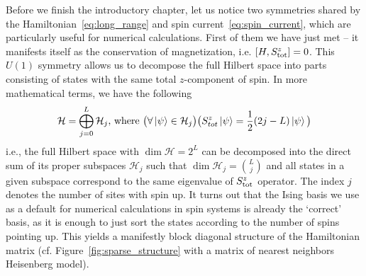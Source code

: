 Before we finish the introductory chapter, let us notice two symmetries shared by the
Hamiltonian~\eqref{eq:long_range} and spin current~\eqref{eq:spin_current}, which are particularly useful for numerical calculations.
First of them we have just met -- it manifests itself as the conservation of magnetization,
i.e. \(\comm{H}{\Sz_{\mathrm{tot}}}=0\).
This \(U(1)\) symmetry allows us to decompose the full Hilbert space into parts consisting of states with the same total \(z\)-component
of spin. In more mathematical terms, we have the following
\begin{equation*}
    \mathcal{H} = \bigoplus_{j = 0}^{L} \mathcal{H}_j \text{, where } \big(\forall \ket{\psi} \in \mathcal{H}_j \big) \big(S^{z}_{tot} \ket{\psi} = \frac{1}{2}(2j-L) \ket{\psi} \big)
\end{equation*}
i.e., the full Hilbert space with \(\dim{\mathcal{H}} = 2^L\) can be decomposed into the direct sum of its proper subspaces
\(\mathcal{H}_j\) such that \(\dim{\mathcal{H}_j} = \binom{L}{j}\) and all states in a given subspace correspond to the same
eigenvalue of \(S^{z}_{\mathrm{tot}}\) operator. The index \(j\) denotes the number of sites with spin up.
It turns out that the Ising basis we use as a default for numerical calculations in spin systems
is already the `correct' basis, as it is enough to just sort the states according to the number of
spins pointing up. This yields a manifestly block diagonal structure of the Hamiltonian matrix
(cf. Figure~\ref{fig:sparse_structure} with a matrix of nearest neighbors Heisenberg model).


